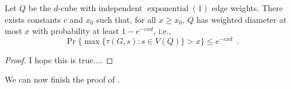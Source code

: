 \documentclass{patmorin}
\DeclareMathOperator{\exponential}{exponential}
\begin{document}
\begin{lem}
   Let $Q$ be the $d$-cube with independent $\exponential(1)$
   edge weights.  There exists constants $c$ and $x_0$ such that,
   for all $x\ge x_0$, $Q$ has weighted diameter at most $x$
   with probability at least $1-e^{-cxd}$, i.e., 
   \[ 
       \Pr\{\max\{\tau(G,s): s\in V(Q) \} > x\} \le e^{-cxd}
       \enspace .
   \]
\end{lem}

\begin{proof}
   I hope this is true....
%
%
%
%
%   
\end{proof}

We can now finish the proof of .
\end{document}
